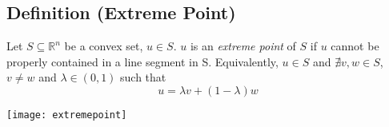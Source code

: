 \begin{defbox}
    \subsection{Definition (Extreme Point)}
    Let $ S\subseteq \mathbb{R}^n $ be a convex set, $ u\in S $. $ u $ is an
    \emph{extreme point} of $ S $ if $ u $ cannot be properly contained in a
    line segment in S. Equivalently, $ u\in S $ and $ \nexists v,w\in S $,
    $ v\neq w $ and $ \lambda\in (0,1) $ such that
    \[ u=\lambda v+(1-\lambda)w \]
\end{defbox}

\begin{center}
    \texttt{[image: extremepoint]}
\end{center}